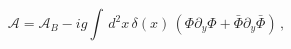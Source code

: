 \begin{equation}\label{Adm0}
\mathcal{A}=\mathcal{A}_B-i g \int\, d^2x\,
\delta(x)\,(\Phi\partial_y\Phi+\bar{\Phi}\partial_y\bar{\Phi})\, ,
\end{equation}

